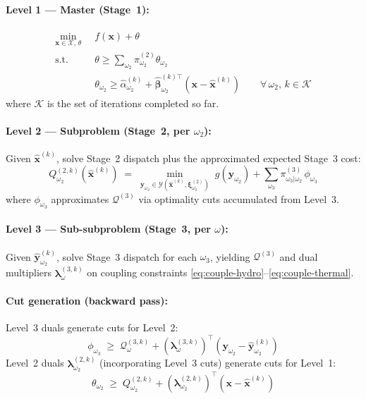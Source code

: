 \documentclass[11pt]{article}
\begin{document}
\paragraph{Level 1 --- Master (Stage~1):}
\begin{equation}\label{eq:benders-master}
\begin{aligned}
  \min_{\mathbf{x} \in \mathcal{X},\,\theta}\;\;
  & f(\mathbf{x}) + \theta \\
  \text{s.t.}\;\;
  & \theta \geq \textstyle\sum_{\omega_2} \pi^{(2)}_{\omega_2}
    \theta_{\omega_2} \\
  & \theta_{\omega_2} \geq
    \hat{\alpha}^{(k)}_{\omega_2}
    + \hat{\boldsymbol{\beta}}^{(k)\top}_{\omega_2}
    (\mathbf{x} - \hat{\mathbf{x}}^{(k)})
    \qquad \forall\, \omega_2,\, k \in \mathcal{K}
\end{aligned}
\end{equation}
where $\mathcal{K}$ is the set of iterations completed so far.

\paragraph{Level 2 --- Subproblem (Stage~2, per $\omega_2$):}
Given $\hat{\mathbf{x}}^{(k)}$, solve Stage~2 dispatch plus the
approximated expected Stage~3 cost:
\begin{equation}\label{eq:benders-sub2}
  Q^{(2,k)}_{\omega_2}(\hat{\mathbf{x}}^{(k)}) \;=\;
  \min_{\mathbf{y}_{\omega_2} \in
    \mathcal{Y}(\hat{\mathbf{x}}^{(k)},
    \boldsymbol{\xi}^{(2)}_{\omega_2})} \;
  g(\mathbf{y}_{\omega_2})
  + \sum_{\omega_3} \pi^{(3)}_{\omega_3|\omega_2}\,\phi_{\omega_3}
\end{equation}
where $\phi_{\omega_3}$ approximates $\mathcal{Q}^{(3)}$ via
optimality cuts accumulated from Level~3.

\paragraph{Level 3 --- Sub-subproblem (Stage~3, per $\omega$):}
Given $\hat{\mathbf{y}}_{\omega_2}^{(k)}$, solve Stage~3 dispatch
for each $\omega_3$, yielding $\mathcal{Q}^{(3)}$ and dual
multipliers $\boldsymbol{\lambda}^{(3,k)}_\omega$ on coupling
constraints
\eqref{eq:couple-hydro}--\eqref{eq:couple-thermal}.

\paragraph{Cut generation (backward pass):}
Level~3 duals generate cuts for Level~2:
\begin{equation}\label{eq:cut-l3}
  \phi_{\omega_3} \;\geq\;
  \mathcal{Q}^{(3,k)}_\omega
  + (\boldsymbol{\lambda}^{(3,k)}_\omega)^\top
  (\mathbf{y}_{\omega_2} - \hat{\mathbf{y}}^{(k)}_{\omega_2})
\end{equation}
Level~2 duals $\boldsymbol{\lambda}^{(2,k)}_{\omega_2}$
(incorporating Level~3 cuts) generate cuts for Level~1:
\begin{equation}\label{eq:cut-l2}
  \theta_{\omega_2} \;\geq\;
  Q^{(2,k)}_{\omega_2}
  + (\boldsymbol{\lambda}^{(2,k)}_{\omega_2})^\top
  (\mathbf{x} - \hat{\mathbf{x}}^{(k)})
\end{equation}
\end{document}
